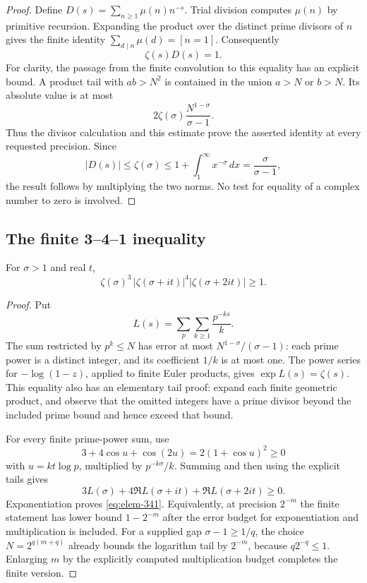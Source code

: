 \begin{proof}
Define $D(s)=\sum_{n\ge1}\mu(n)n^{-s}$.  Trial division computes
$\mu(n)$ by primitive recursion.  Expanding the product over the distinct
prime divisors of $n$ gives the finite identity
$\sum_{d\mid n}\mu(d)=[n=1]$.  Consequently
\[
 \zeta(s)D(s)=1.
\]
For clarity, the passage from the finite convolution to this equality
has an explicit bound.  A product tail with $ab>N^2$ is contained in the
union $a>N$ or $b>N$.  Its absolute value is at most
\[
 2\zeta(\sigma)\frac{N^{1-\sigma}}{\sigma-1}.
\]
Thus the divisor calculation and this estimate prove the asserted
identity at every requested precision.  Since
\[
 |D(s)|\le\zeta(\sigma)
 \le1+\int_1^\infty x^{-\sigma}\,dx
 =\frac{\sigma}{\sigma-1},
\]
the result follows by multiplying the two norms.  No test for equality
of a complex number to zero is involved.
\end{proof}

\subsection{The finite 3--4--1 inequality}

\begin{lemma}
\label{lem:elem-341}
For $\sigma>1$ and real $t$,
\begin{equation}
 \zeta(\sigma)^3\,|\zeta(\sigma+it)|^4
                 |\zeta(\sigma+2it)|\ge1.
 \label{eq:elem-341}
\end{equation}
\end{lemma}

\begin{proof}
Put
\[
 L(s)=\sum_p\sum_{k\ge1}\frac{p^{-ks}}k.
\]
The sum restricted by $p^k\le N$ has error at most
$N^{1-\sigma}/(\sigma-1)$: each prime power is a distinct integer, and
its coefficient $1/k$ is at most one.  The power series for
$-\log(1-z)$, applied to finite Euler products, gives
$\exp L(s)=\zeta(s)$.  This equality also has an elementary tail proof:
expand each finite geometric product, and observe that the omitted
integers have a prime divisor beyond the included prime bound and hence
exceed that bound.

For every finite prime-power sum, use
\[
 3+4\cos u+\cos(2u)=2(1+\cos u)^2\ge0
\]
with $u=kt\log p$, multiplied by $p^{-k\sigma}/k$.  Summing and then
using the explicit tails gives
\[
 3L(\sigma)+4\Re L(\sigma+it)+\Re L(\sigma+2it)\ge0.
\]
Exponentiation proves \eqref{eq:elem-341}.  Equivalently, at precision
$2^{-m}$ the finite statement has lower bound $1-2^{-m}$ after the
error budget for exponentiation and multiplication is included.  For a
supplied gap $\sigma-1\ge1/q$, the choice
$N=2^{q(m+q)}$ already bounds the logarithm tail by $2^{-m}$, because
$q2^{-q}\le1$.  Enlarging $m$ by the explicitly computed multiplication
budget completes the finite version.
\end{proof}


